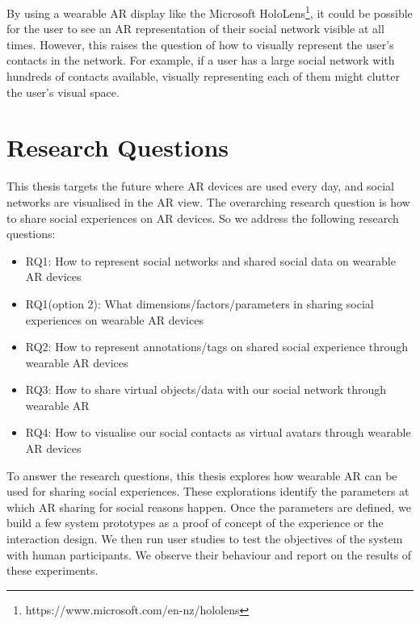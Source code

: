 By using a wearable AR display like the Microsoft HoloLens\footnote{https://www.microsoft.com/en-nz/hololens}, it could be possible for the user to see an AR representation of their social network visible at all times. However, this raises the question of how to visually represent the user's contacts in the network. For example, if a user has a large social network with hundreds of contacts available, visually representing each of them might clutter the user's visual space.


\section{Research Questions}

This thesis targets the future where AR devices are used every day, and social networks are visualised in the AR view. The overarching research question is how to share social experiences on AR devices. So we address the following research questions: 

\begin{itemize}
    \item RQ1: How to represent social networks and shared social data on wearable AR devices 
    
    \item RQ1(option 2): What dimensions/factors/parameters in sharing social experiences on wearable AR devices 
    
    \item RQ2: How to represent annotations/tags on shared social experience through wearable AR devices
    
    \item RQ3: How to share virtual objects/data with our social network through wearable AR 
    
    \item RQ4: How to visualise our social contacts as virtual avatars through wearable AR devices

\end{itemize}

To answer the research questions, this thesis explores how wearable AR can be used for sharing social experiences. These explorations identify the parameters at which AR sharing for social reasons happen. Once the parameters are defined, we build a few system prototypes as a proof of concept of the experience or the interaction design. We then run user studies to test the objectives of the system with human participants. We observe their behaviour and report on the results of these experiments. 

